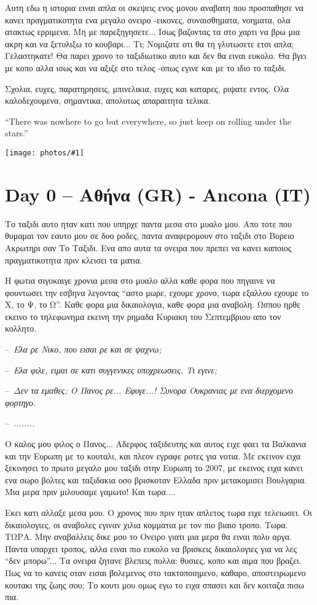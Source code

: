 \documentclass[]{book}
\newcommand\dialogue[1]{\par\noindent--~\textit{#1}}
\newcommand\photo[1]{\noindent\texttt{[image: photos/\#1]}}
\begin{document}
Αυτη εδω η ιστορια ειναι απλα οι σκεψεις ενος μονου αναβατη που προσπαθησε να κανει πραγματικοτητα ενα μεγαλο ονειρο -εικονες, συναισθηματα, νοηματα, ολα ατακτως ερριμενα.
Μη με παρεξηγησετε... Ισως βαζοντας τα στο χαρτι να βρω μια ακρη και να ξετυλιξω το κουβαρι...
Τι; Νομιζατε οτι θα τη γλυτωσετε ετσι απλα; Γελαστηκατε! Θα παρει χρονο το ταξιδιωτικο αυτο και δεν θα ειναι ευκολο.
Θα βγει με κοπο αλλα ισως και να αξιζε στο τελος -οπως εγινε και με το ιδιο το ταξιδι.

Σχολια, ευχες, παρατηρησεις, μπινελικια, ευχες και καταρες, ριψατε εντος. Ολα καλοδεχουμενα, σημαντικα, απολυτως απαραιτητα τελικα.

``There was nowhere to go but everywhere, so just keep on rolling under the stars.''

\photo{1.jpg}

\chapter*{Day 0 -- Αθήνα (GR) - Ancona (IT)}

Το ταξιδι αυτο ηταν κατι που υπηρχε παντα μεσα στο μυαλο μου. Απο τοτε που θυμαμαι τον εαυτο μου σε δυο ροδες, παντα αναφερομουν στο ταξιδι στο Βορειο Ακρωτηρι σαν Το Ταξιδι. Eνα απο αυτα τα ονειρα που πρεπει να κανει καποιος πραγματικοτητα πριν κλεισει τα ματια.

Η φωτια σιγοκαιγε χρονια μεσα στο μυαλο αλλα καθε φορα που πηγαινε να φουντωσει την εσβηνα λεγοντας ``αστο μωρε, εχουμε χρονο, τωρα εξαλλου εχουμε το Χ, το Ψ, το Ω''. Καθε φορα μια δικαιολογια, καθε φορα μια αναβολη. Ωσπου ηρθε εκεινο το τηλεφωνημα εκεινη την ρημαδα Κυριακη του Σεπτεμβριου απο τον κολλητο.

\dialogue{Ελα ρε Νικο, που εισαι ρε και σε ψαχνω;}
\dialogue{Ελα φιλε, ειμαι σε κατι συγγενικες υποχρεωσεις. Τι εγινε;}
\dialogue{Δεν τα εμαθες; Ο Πανος ρε... Εφυγε...! Συνορα Ουκρανιας με ενα διερχομενο φορτηγο.}
\dialogue{........}

Ο καλος μου φιλος ο Πανος... Αδερφος ταξιδευτης και αυτος ειχε φαει τα Βαλκανια και την Ευρωπη με το κουταλι, και πλεον εγραφε ροτες για νοτια. Με εκεινον ειχα ξεκινησει το πρωτο μεγαλο μου ταξιδι στην Ευρωπη το 2007, με εκεινος ειχα κανει ενα σωρο βολτες και ταξιδακια οσο βρισκοταν Ελλαδα πριν μετακομισει Βουλγαρια. Μια μερα πριν μιλουσαμε γαμωτο! Και τωρα....

Εκει κατι αλλαξε μεσα μου. Ο χρονος που πριν ηταν απλετος τωρα ειχε τελειωσει. Οι δικαιολογιες, οι αναβολες εγιναν χιλια κομματια με τον πιο βιαιο τροπο. Τωρα. ΤΩΡΑ.
Μην αναβαλλεις δικε μου το Ονειρο γιατι μια μερα θα ειναι πολυ αργα. Παντα υπαρχει τροπος, αλλα ειναι πιο ευκολο να βρισκεις δικαιολογιες για να λες ``δεν μπορω''... Τα ονειρα ζητανε βλεπεις πολλα: θυσιες, κοπο και αιμα που βραζει. Πως να το κανεις οταν εισαι βολεμενος στο τακτοποιημενο, καθαρο, αποστειρωμενο κουτακι της ζωης σου; Το κουτι μου ομως εγω το ειχα σπασει και δεν κοιταζα πισω πια.
\end{document}
